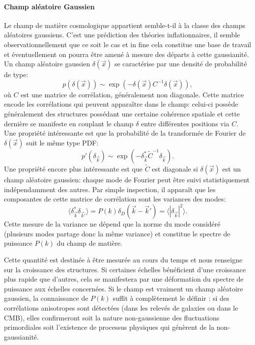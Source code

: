 \paragraph{Champ aléatoire Gaussien} Le champ de matière cosmologique appartient semble-t-il à la classe des champs aléatoires gaussiens. C'est une prédiction des théories inflationnaires, il semble observationnellement que ce soit le cas et in fine cela constitue une base de travail et éventuellement on pourra être amené à mesure des départs à cette gaussianité. Un champ aléatoire gaussien $\delta(\vec x)$ se caractérise par une densité de probabilité de type:
\begin{equation}
p(\delta(\vec x)) \sim \exp( -\delta (\vec x) C^{-1} \delta (\vec x)),
\end{equation}
où $C$ est une matrice de corrélation, généralement non diagonale. Cette matrice encode les corrélations qui peuvent apparaître dans le champ: celui-ci possède généralement des structures possédant une certaine cohérence spatiale et cette dernière se manifeste en couplant le champ $\delta$ entre différentes positions via $C$. Une propriété intéressante est que la probabilité de la transformée de Fourier de $\delta (\vec x)$ suit le même type PDF:
\begin{equation}
p'(\delta_{\vec k})\sim \exp( -\delta_{\vec k}^* \tilde C^{-1} \delta_{\vec k}).
\end{equation}
Une propriété encore plus intéressante est que $\tilde C$ est diagonale si $\delta(\vec x)$ est un champ aléatoire gaussien: chaque mode de Fourier peut être suivi statistiquement indépendamment des autres. Par simple inspection, il apparaît que les composantes de cette matrice de corrélation sont les variances des modes:
\begin{equation}
\langle \delta_{\vec k}^* \delta_{\vec k'}\rangle = P(k)\delta_D(\vec k -\vec k')=\langle|\delta_{\vec k}|^2\rangle.
\end{equation}
Cette mesure de la variance ne dépend que la norme du mode considéré (plusieurs modes partage donc la même variance) et constitue le spectre de puissance $P(k)$ du champ de matière.

Cette quantité est destinée à être mesurée au cours du temps et nous renseigne sur la croissance des structures. Si certaines échelles bénéficient d'une croissance plus rapide que d'autres, cela se manifestera par une déformation du spectre de puissance aux échelles concernées.  Si le champ est vraiment un champ aléatoire gaussien, la connaissance de $P(k)$ suffit à complètement le définir : si des corrélations anisotropes sont détectées (dans les relevés de galaxies ou dans le CMB), elles confirmeront soit la nature non-gaussienne des fluctuations primordiales soit l'existence de processus physiques qui génèrent de la non-gaussianité.

